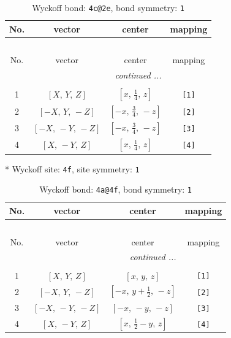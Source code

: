 \documentclass[fleqn,8pt]{jsarticle}
\begin{document}
\begin{longtable}{cccc}
\caption{Wyckoff bond: {\tt 4c@2e}, bond symmetry: {\tt 1}}
 \\
 \hline \hline
No. & vector & center & mapping \\ \hline \endfirsthead

\multicolumn{3}{l}{\tablename\ \thetable{}} \\
 \hline \hline
No. & vector & center & mapping \\ \hline \endhead

 \hline \hline
\multicolumn{3}{r}{\footnotesize\it continued ...} \\ \endfoot

 \hline \hline
\multicolumn{3}{r}{} \\ \endlastfoot

1 & $\left[ X,\, Y,\, Z \right]$ & $\left[ x,\, \frac{1}{4},\, z \right]$ & {\tt [1]} \\ \hline
2 & $\left[ - X,\, Y,\, - Z \right]$ & $\left[ - x,\, \frac{3}{4},\, - z \right]$ & {\tt [2]} \\ \hline
3 & $\left[ - X,\, - Y,\, - Z \right]$ & $\left[ - x,\, \frac{3}{4},\, - z \right]$ & {\tt [3]} \\ \hline
4 & $\left[ X,\, - Y,\, Z \right]$ & $\left[ x,\, \frac{1}{4},\, z \right]$ & {\tt [4]} \\
\end{longtable}
* Wyckoff site: {\tt 4f}, site symmetry: {\tt 1}
\renewcommand{\arraystretch}{1.2}
\begin{longtable}{cccc}
\caption{Wyckoff bond: {\tt 4a@4f}, bond symmetry: {\tt 1}}
 \\
 \hline \hline
No. & vector & center & mapping \\ \hline \endfirsthead

\multicolumn{3}{l}{\tablename\ \thetable{}} \\
 \hline \hline
No. & vector & center & mapping \\ \hline \endhead

 \hline \hline
\multicolumn{3}{r}{\footnotesize\it continued ...} \\ \endfoot

 \hline \hline
\multicolumn{3}{r}{} \\ \endlastfoot

1 & $\left[ X,\, Y,\, Z \right]$ & $\left[ x,\, y,\, z \right]$ & {\tt [1]} \\ \hline
2 & $\left[ - X,\, Y,\, - Z \right]$ & $\left[ - x,\, y + \frac{1}{2},\, - z \right]$ & {\tt [2]} \\ \hline
3 & $\left[ - X,\, - Y,\, - Z \right]$ & $\left[ - x,\, - y,\, - z \right]$ & {\tt [3]} \\ \hline
4 & $\left[ X,\, - Y,\, Z \right]$ & $\left[ x,\, \frac{1}{2} - y,\, z \right]$ & {\tt [4]} \\
\end{longtable}
\end{document}
